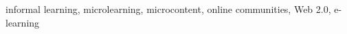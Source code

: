 \begin{IEEEkeywords}
	informal learning, microlearning, microcontent, online communities, Web 2.0,
	e-learning
\end{IEEEkeywords}